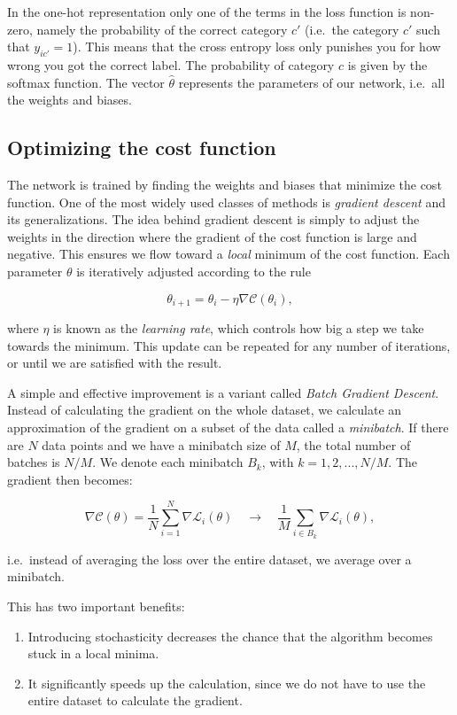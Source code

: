 \documentclass[%
oneside,                 %
final,                   %
10pt]{article}
\begin{document}
In the one-hot representation only one of the terms in the loss function is non-zero, namely the
probability of the correct category $c'$  
(i.e.~the category $c'$ such that $y_{ic'} = 1$). This means that the cross entropy loss only punishes you for how wrong
you got the correct label. The probability of category $c$ is given by the softmax function. The vector $\hat{\theta}$ represents the parameters of our network, i.e.~all the weights and biases.  


\subsection{Optimizing the cost function}

The network is trained by finding the weights and biases that minimize the cost function. One of the most widely used classes of methods is \emph{gradient descent} and its generalizations. The idea behind gradient descent
is simply to adjust the weights in the direction where the gradient of the cost function is large and negative. This ensures we flow toward a \emph{local} minimum of the cost function.  
Each parameter $\theta$ is iteratively adjusted according to the rule  

$$ \theta_{i+1} = \theta_i - \eta \nabla \mathcal{C}(\theta_i) ,$$

where $\eta$ is known as the \emph{learning rate}, which controls how big a step we take towards the minimum.  
This update can be repeated for any number of iterations, or until we are satisfied with the result.  

A simple and effective improvement is a variant called \emph{Batch Gradient Descent}.  
Instead of calculating the gradient on the whole dataset, we calculate an approximation of the gradient
on a subset of the data called a \emph{minibatch}.  
If there are $N$ data points and we have a minibatch size of $M$, the total number of batches
is $N/M$.  
We denote each minibatch $B_k$, with $k = 1, 2,...,N/M$. The gradient then becomes:  

$$ \nabla \mathcal{C}(\theta) = \frac{1}{N} \sum_{i=1}^N \nabla \mathcal{L}_i(\theta) \quad \rightarrow \quad
\frac{1}{M} \sum_{i \in B_k} \nabla \mathcal{L}_i(\theta) ,$$

i.e.~instead of averaging the loss over the entire dataset, we average over a minibatch.  

This has two important benefits:  
\begin{enumerate}
\item Introducing stochasticity decreases the chance that the algorithm becomes stuck in a local minima.  

\item It significantly speeds up the calculation, since we do not have to use the entire dataset to calculate the gradient.  
\end{enumerate}
\end{document}

